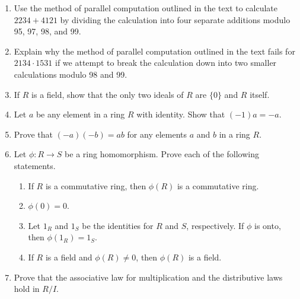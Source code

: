 {\begin{enumerate}
\begin{minipage}[t]{4.6in}
\begin{minipage}[t]{2.25in}
\begin{itemize}
 
\end{itemize}
\end{minipage}
\end{minipage}
 
\vspace{2pt}        %
 
 
 
 
\bf\item\rm  %
Use the method of parallel computation outlined in the text to
calculate $2234 + 4121$ by dividing the calculation 
into four separate additions modulo 95, 97, 98, and 99. 
 
\bf\item\rm
Explain why the method of parallel computation outlined in the text
fails for $2134 \cdot 1531$ if we attempt to break the calculation
down into two smaller calculations modulo 98 and 99.
 
 
\bf\item\rm
If $R$ is a field,
 show that the only two ideals of $R$ are $\{ 0 \}$
and $R$ itself.
 
 
\bf\item\rm
Let $a$ be any element in a ring $R$ with identity. Show that $(-1)a=
-a$. 
 
 
\bf\item\rm
Prove that $(-a)(-b) = ab$ for any elements $a$ and $b$ in a ring $R$. 
 
  
\bf\item\rm
Let $\phi : R \rightarrow S$ be a ring homomorphism. Prove each of the
following statements. 
\begin{enumerate}
 
 \bf\item\rm
If $R$ is a commutative ring, then $\phi(R)$ is a commutative ring. 
 
 \bf\item\rm
$\phi( 0 ) = 0$.
 
 \bf\item\rm
Let $1_R$ and $1_S$ be the identities for $R$ and $S$, respectively.
If $\phi$ is onto, then $\phi(1_R) = 1_S$. 
 
 \bf\item\rm
If $R$ is a field and $\phi(R) \neq 0$, then $\phi(R)$ is a field.
 
\end{enumerate}
 
 
\bf\item\rm
Prove that the associative law for multiplication and the distributive
laws hold in $R/I$. 
 

\end{enumerate}}

